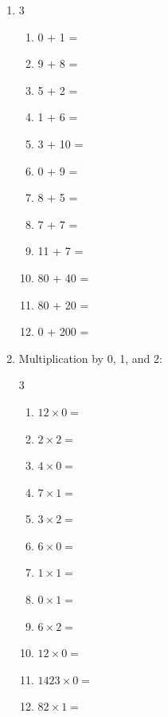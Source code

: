 \documentclass{tufte-book}
\begin{document}
\begin{enumerate}
  \item
  \begin{multicols}{3}
    \begin{enumerate}\bigskip
      \item 0 + 1 = \dotfill\bigskip
      \item 9 + 8 = \dotfill\bigskip
      \item 5 + 2 = \dotfill\bigskip
      \item 1 + 6 = \dotfill
      \item 3 + 10 = \dotfill\bigskip
      \item 0 + 9 = \dotfill\bigskip
      \item 8 + 5 = \dotfill\bigskip
      \item 7 + 7 = \dotfill
      \item 11 + 7 = \dotfill\bigskip
      \item 80 + 40 = \dotfill\bigskip
      \item 80 + 20 = \dotfill\bigskip
      \item 0 + 200 = \dotfill
    \end{enumerate}
  \end{multicols}

  \item Multiplication by 0, 1, and 2:\bigskip
  \begin{multicols}{3}
  \begin{enumerate}
    \item $12 \times 0 =$\dotfill\bigskip
    \item $2 \times 2 =$\dotfill\bigskip
    \item $4 \times 0 =$\dotfill\bigskip
    \item $7 \times 1 =$\dotfill
    \item $3 \times 2 =$\dotfill\bigskip
    \item $6 \times 0 =$\dotfill\bigskip
    \item $1 \times 1 =$\dotfill\bigskip
    \item $0 \times 1 =$\dotfill
    \item $6 \times 2 =$\dotfill\bigskip
    \item $12 \times 0 =$\dotfill\bigskip
    \item $1423 \times 0 =$\dotfill\bigskip
    \item $82 \times 1 =$\dotfill
  \end{enumerate}
  \end{multicols}
\end{enumerate}
\end{document}
